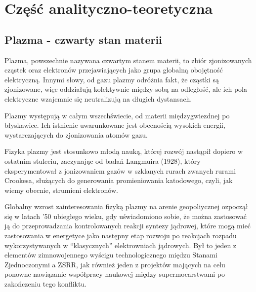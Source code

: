 \section[Część analityczno-teoretyczna]{Część analityczno-teoretyczna} %

    \subsection{Plazma - czwarty stan materii}

    Plazma, powszechnie nazywana czwartym stanem materii, to zbiór zjonizowanych
    cząstek oraz elektronów przejawiających jako grupa globalną obojętność elektryczną. Innymi słowy, od gazu plazmy
    odróżnia fakt, że cząstki są zjonizowane, więc oddziałują kolektywnie między sobą na odległość,
    ale ich pola elektryczne wzajemnie się neutralizują na długich dystansach.

    Plazmy występują w całym wszechświecie, od materii międzygwiezdnej po błyskawice.
    Ich istnienie uwarunkowane jest obecnością wysokich energii, wystarczających do zjonizowania atomów gazu.

    Fizyka plazmy jest stosunkowo młodą nauką, której rozwój nastąpił dopiero w ostatnim stuleciu, zaczynając od badań
    Langmuira (1928), który eksperymentował z jonizowaniem gazów w szklanych rurach zwanych rurami Crookesa,
    służących do generowania promieniowania katodowego, czyli, jak wiemy obecnie, strumieni elektronów.

    Globalny wzrost zainteresowania fizyką plazmy na arenie geopoliycznej ozpoczął się w latach '50 ubiegłego wieku,
    gdy uświadomiono sobie, że można zastosować ją do przeprowadzania kontrolowanych reakcji syntezy jądrowej, 
    które mogą mieć zastosowania w energetyce jako następny etap rozwoju po reakcjach rozpadu wykorzystywanych
    w ``klasycznych'' elektrowniach jądrowych. Był to jeden z elementów zimnowojennego wyścigu technologicznego
    międzu Stanami Zjednoczonymi a ZSRR,
    jak również jeden z projektów mających na celu ponowne nawiązanie współpracy naukowej między supermocarstwami
    po zakończeniu tego konfliktu. 

